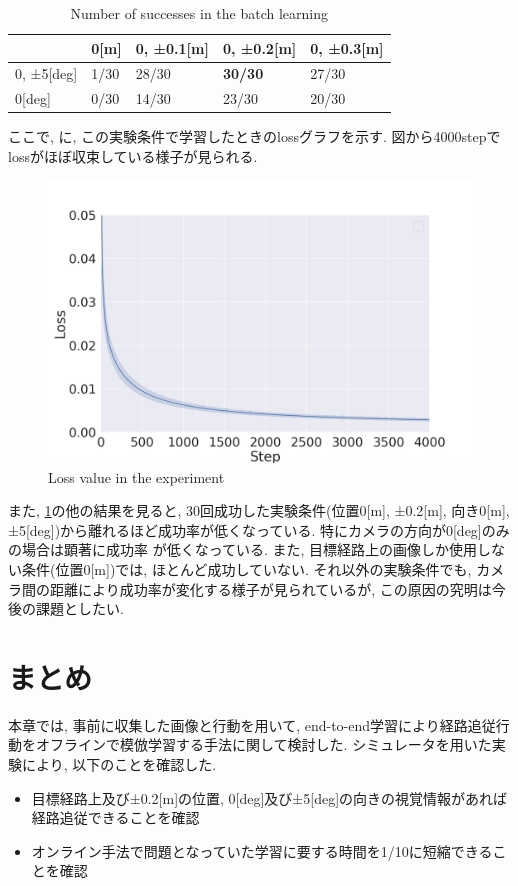 \begin{table}[h]
  \centering
  \caption{Number of successes in the batch learning}
  \begin{tabular}{|p{2cm}|p{2cm}|p{2cm}|p{2cm}|p{2cm}|} \hline
     & 0[m] & 0, ±0.1[m] & 0, ±0.2[m] & 0, ±0.3[m] \\ \hline
    0, ±5[deg] & 1/30 & 28/30 & \bf30/30 & 27/30 \\ \hline
    0[deg] & 0/30 & 14/30 & 23/30 & 20/30 \\ \hline
  \end{tabular}
  \label{tb:exp1}
\end{table}

ここで, に, この実験条件で学習したときのlossグラフを示す. 図から4000stepでlossがほぼ収束している様子が見られる. 

\newpage
\begin{figure}[h]
  \centering
  \includegraphics[keepaspectratio, scale=0.35]{images/loss_00_02_4000.png}
  \caption{Loss value in the experiment}
  \label{Fig:loss_00_02_4000}
  \end{figure}

また, \ref{tb:exp1}の他の結果を見ると, 30回成功した実験条件(位置0[m], ±0.2[m], 向き0[m], ±5[deg])から離れるほど成功率が低くなっている. 特にカメラの方向が0[deg]のみの場合は顕著に成功率
が低くなっている. また, 目標経路上の画像しか使用しない条件(位置0[m])では, ほとんど成功していない. それ以外の実験条件でも, カメラ間の距離により成功率が変化する様子が見られているが, この原因の究明は今後の課題としたい. 

\section{まとめ}
本章では, 事前に収集した画像と行動を用いて, end-to-end学習により経路追従行動をオフラインで模倣学習する手法に関して検討した. シミュレータを用いた実験により, 以下のことを確認した. 

\begin{itemize}
  \item 目標経路上及び±0.2[m]の位置, 0[deg]及び±5[deg]の向きの視覚情報があれば経路追従できることを確認
  \item オンライン手法で問題となっていた学習に要する時間を1/10に短縮できることを確認
\end{itemize}